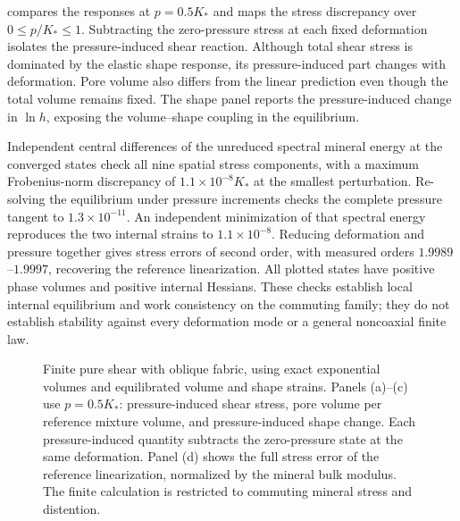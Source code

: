  compares the responses at \(p=0.5K_*\) and
maps the stress discrepancy over \(0\le p/K_*\le1\). Subtracting the
zero-pressure stress at each fixed deformation isolates the pressure-induced
shear reaction. Although total shear stress is dominated by the elastic
shape response, its pressure-induced part changes with deformation.
Pore volume also differs from the linear prediction even though the total
volume remains fixed. The shape panel reports the pressure-induced change
in \(\ln h\), exposing the volume--shape coupling in the equilibrium.

Independent central differences of the unreduced spectral mineral energy
at the converged states check all nine spatial stress components, with a
maximum Frobenius-norm discrepancy of \(1.1\times10^{-8}K_*\) at the
smallest perturbation. Re-solving the equilibrium under pressure increments
checks the complete pressure tangent to \(1.3\times10^{-11}\).
An independent minimization of that spectral energy reproduces the two
internal strains to \(1.1\times10^{-8}\). Reducing deformation and
pressure together gives stress errors of second order, with measured
orders \(1.9989\)--\(1.9997\), recovering the reference linearization.
All plotted states have positive phase volumes and positive internal
Hessians. These checks establish local internal equilibrium and work
consistency on the commuting family; they do not establish stability
against every deformation mode or a general noncoaxial finite law.

\begin{figure}[htbp]
 \centering
 \caption{Finite pure shear with oblique fabric, using exact exponential
 volumes and equilibrated volume and shape strains. Panels (a)--(c) use
 \(p=0.5K_*\): pressure-induced shear stress, pore volume per reference
 mixture volume, and pressure-induced shape change. Each pressure-induced
 quantity subtracts the zero-pressure state at the same deformation.
 Panel (d) shows the full stress error of the reference linearization,
 normalized by the mineral bulk modulus. The finite calculation is
 restricted to commuting mineral stress and distention.}
 \label{fig:fabric-finite}
\end{figure}
